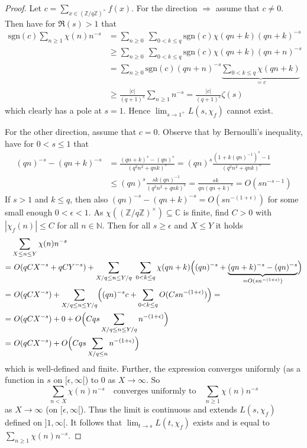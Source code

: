 \documentclass{scrartcl}
\newcommand{\N}{\mathbb{N}}
\newcommand{\Z}{\mathbb{Z}}
\newcommand{\C}{\mathbb{C}}
\newcommand{\units}{\times}
\newcommand{\sgn}{\mathrm{sgn}}
\theoremstyle{definition}
\begin{document}
\begin{proof}
    Let $c = \sum_{x \in (\Z/q\Z)^\units} f(x)$.
    For the direction $\Rightarrow$ assume that $c \neq 0$.
    Then have for $\Re(s) > 1$ that
    \begin{align*}
        \sgn(c) \sum_{n \geq 1} \chi(n) n^{-s} &= \sum_{n \geq 0} \ \sum_{0 < k \leq q} \sgn(c) \chi(qn + k) (qn + k)^{-s} \\
        &\geq \sum_{n \geq 0} \ \sum_{0 < k \leq q}\sgn(c) \chi(qn + k) (qn + n)^{-s} \\
        &= \sum_{n \geq 0} \sgn(c) (qn + n)^{-s} \underbrace{\sum_{0 < k \leq q} \chi(qn + k)}_{= c} \\
        &\geq \frac {|c|} {(q + 1)^s} \sum_{n \geq 1} n^{-s} = \frac {|c|} {(q + 1)^s} \zeta(s)
    \end{align*}
    which clearly has a pole at $s = 1$. Hence $\lim_{s \to 1^+} L(s, \chi_f)$ cannot exist.

    For the other direction, assume that $c = 0$.
    Observe that by Bernoulli's inequality, have for $0 < s \leq 1$ that
    \begin{align*}
        (qn)^{-s} - (qn + k)^{-s} &= \frac {(qn + k)^s - (qn)^s} {(q^2n^2 + qnk)^s} = (qn)^{s} \frac {(1 + k(qn)^{-1})^s - 1} {(q^2n^2 + qnk)^s} \\
        &\leq (qn)^s \frac {sk(qn)^{-1}} {(q^2n^2 + qnk)^s} = \frac {sk} {qn(qn + k)^s} = O(sn^{-s - 1})
    \end{align*}
    If $s > 1$ and $k \leq q$, then also $(qn)^{-s} - (qn + k)^{-s} = O(sn^{-(1 + \epsilon)})$ for some small enough $0 < \epsilon < 1$.
    As $\chi((\Z/q\Z)^\units) \subseteq \C$ is finite, find $C > 0$ with $|\chi_f(n)| \leq C$ for all $n \in \N$. 
    Then for all $s \geq \epsilon$ and $X \leq Y$ it holds
    \begin{align*}
        &\sum_{X \leq n \leq Y} \chi(n) n^{-s} \\
        =& \ O(qCX^{-s} + qCY^{-s}) + \sum_{X/q \leq n \leq Y/q} \ \sum_{0 < k \leq q} \chi(qn + k) \Bigl( (qn)^{-s} + \underbrace{(qn + k)^{-s} - (qn)^{-s}}_{= O(sn^{-(1 + \epsilon)})} \Bigr) \\
        =& \ O(qCX^{-s}) + \sum_{X/q \leq n \leq Y/q} \Bigl( (qn)^{-s} c + \sum_{0 < k \leq q} O(Csn^{-(1 + \epsilon)}) \Bigr) = \\
        =& \ O(qCX^{-s}) + 0 + O\Bigl( Cqs \sum_{X/q \leq n \leq Y/q} n^{-(1 + \epsilon)} \Bigr) \\
        =& \ O(qCX^{-s}) + O\Bigl( Cqs \sum_{X/q \leq n} n^{-(1 + \epsilon)} \Bigr)
    \end{align*}
    which is well-defined and finite.
    Further, the expression converges uniformly (as a function in $s$ on $[\epsilon, \infty[$) to $0$ as $X \to \infty$. 
    So
    \begin{equation*}
        \sum_{n < X} \chi(n) n^{-s} \quad \text{converges uniformly to} \quad \sum_{n \geq 1} \chi(n) n^{-s}
    \end{equation*}
    as $X \to \infty$ (on $[\epsilon, \infty[$). 
    Thus the limit is continuous and extends $L(s, \chi_f)$ defined on $]1, \infty[$.
    It follows that $\lim_{t \to s} L(t, \chi_f)$ exists and is equal to $\sum_{n \geq 1} \chi(n) n^{-s}$.
\end{proof}
\end{document}
